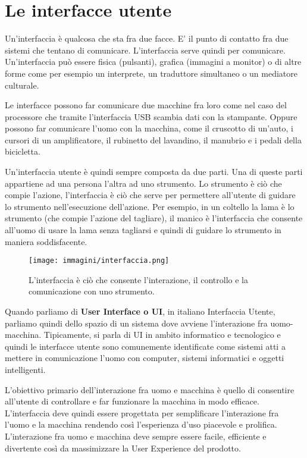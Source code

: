 
\chapter{Le interfacce utente}

Un'interfaccia è qualcosa che sta fra due facce. E' il punto di contatto fra due sistemi che tentano di comunicare. L'interfaccia serve quindi per comunicare. Un'interfaccia può essere fisica (pulsanti), grafica (immagini a monitor) o di altre forme come per esempio un interprete, un traduttore simultaneo o un mediatore culturale. 

Le interfacce possono far comunicare due macchine fra loro come nel caso del processore che tramite l'interfaccia USB scambia dati con la stampante. Oppure possono far comunicare l’uomo con la macchina, come il cruscotto di un’auto, i cursori di un amplificatore, il rubinetto del lavandino, il manubrio e i pedali della bicicletta.

Un'interfaccia utente è quindi sempre composta da due parti. Una di queste parti appartiene ad una persona l'altra ad uno strumento. Lo strumento è ciò che compie l'azione, l’interfaccia è ciò che serve per permettere all'utente di guidare lo strumento nell'esecuzione dell'azione. Per esempio, in un coltello la lama è lo strumento (che compie l'azione del tagliare), il manico è l’interfaccia che consente all'uomo di usare la lama senza tagliarsi e quindi di guidare lo strumento in maniera soddisfacente. 

\begin{figure}[!h]
	\centering
	\texttt{[image: immagini/interfaccia.png]}
	\caption{L'interfaccia è ciò che consente l'interazione, il controllo e la comunicazione con uno strumento.}
\end{figure}


Quando parliamo di \textbf{User Interface o UI}, in italiano Interfaccia Utente, parliamo quindi dello spazio di un sistema dove avviene l'interazione fra uomo-macchina. Tipicamente, si parla di UI in ambito informatico e tecnologico e quindi le interfacce utente sono comunemente identificate come sistemi atti a mettere in comunicazione l'uomo con computer, sistemi informatici e oggetti intelligenti.

L'obiettivo primario dell'interazione fra uomo e macchina è quello di consentire all'utente di controllare e far funzionare la macchina in modo efficace. L'interfaccia deve quindi essere progettata per semplificare l'interazione fra l'uomo e la macchina rendendo così l'esperienza d'uso piacevole e prolifica. L'interazione fra uomo e macchina deve sempre essere facile, efficiente e divertente così da massimizzare la User Experience del prodotto.

